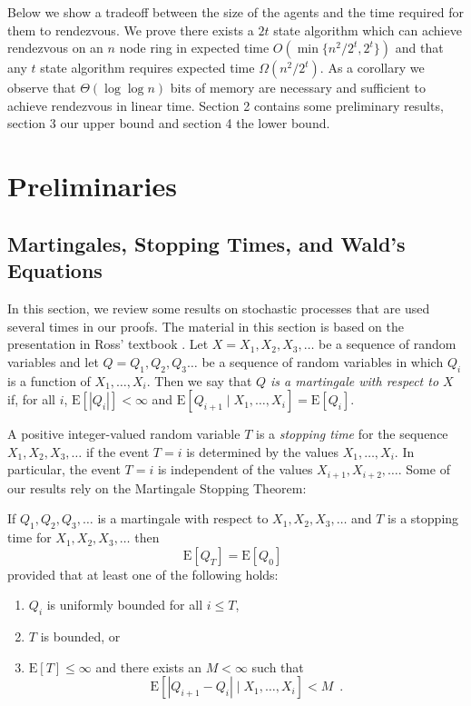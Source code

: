 \documentclass[lotsofwhite]{patmorin}
\newcommand{\E}{\mathrm{E}}
\begin{document}
Below we show a tradeoff between the size of the agents and the time
required for them to rendezvous. We prove there exists a $2t$ state
algorithm which can achieve rendezvous on an $n$ node ring in expected
time $O(\min \{ n^2/2^{t}, 2^{t}\} )$ and that any $t$ state algorithm
requires expected time $\Omega( n^2/2^t )$.  As a corollary we observe
that $\Theta(\log \log n)$ bits of memory are necessary and sufficient
to achieve rendezvous in linear time.  Section 2 contains some
preliminary results, section 3 our upper bound and section 4 the lower
bound. 


\section{Preliminaries}

\subsection{Martingales, Stopping Times, and Wald's Equations}

In this section, we review some results on stochastic processes that
are used several times in our proofs.  The material in this section is
based on the presentation in Ross' textbook \cite[Chapter 6]{ross}.
Let $X=X_1,X_2,X_3,\ldots$ be a sequence of random variables and let
$Q=Q_1,Q_2,Q_3\ldots$ be a sequence of random variables in which $Q_i$
is a function of $X_1,\ldots,X_i$.  Then we say that \emph{$Q$ is a
martingale with respect to $X$} if, for all $i$, $\E[|Q_i|] < \infty$
and $\E[Q_{i+1}\mid X_1,\ldots,X_i] = \E[Q_i]$.

A positive integer-valued random variable $T$ is a \emph{stopping
time} for the sequence $X_1,X_2,X_3,\ldots$ if the event $T=i$ is
determined by the values $X_1,\ldots,X_i$.  In particular, the event
$T=i$ is independent of the values $X_{i+1},X_{i+2},\ldots$.  Some of
our results rely on the Martingale Stopping Theorem:

\begin{thm}
If $Q_1,Q_2,Q_3,\ldots$ is a martingale with respect to
$X_1,X_2,X_3,\ldots$ and $T$ is a stopping time for
$X_1,X_2,X_3,\ldots$ then
\[
   \E[Q_T] = \E[Q_0] \enspace 
\]
provided that at least one of the following holds:
\begin{enumerate}
\item $Q_i$ is uniformly bounded for all $i\le T$,
\item $T$ is bounded, or
\item $\E[T]\le \infty$ and there exists an $M<\infty$ such that
\[ \E\left[|Q_{i+1}-Q_i| \mid X_1,\ldots,X_i \right] < M  \enspace . \]
\end{enumerate}
\end{thm}
\end{document}
